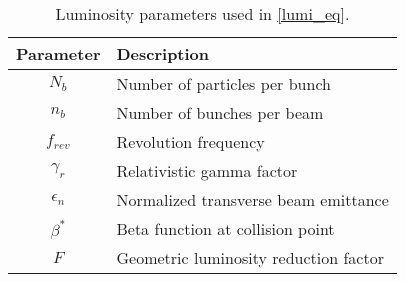 \begin{table}[h]
\noindent \centering{}
\caption{Luminosity parameters used in \eqref{lumi_eq}.}
\label{lumi_params}
\begin{tabular}{cl}
\hline
Parameter & Description\\
\hline
$N_{b}$ & Number of particles per bunch\\
$n_{b}$ & Number of bunches per beam\\
$f_{rev}$ & Revolution frequency\\
$\gamma_{r}$ & Relativistic gamma factor\\
$\epsilon_{n}$ & Normalized transverse beam emittance\\
$\beta^{*}$ & Beta function at collision point\\
$F$ & Geometric luminosity reduction factor\\
\hline
\end{tabular}
\end{table}
